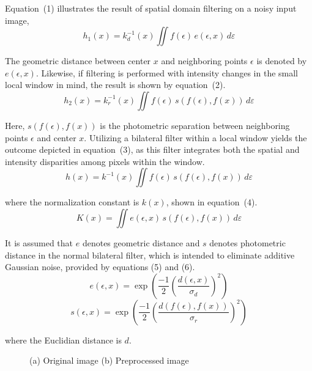 \documentclass[conference]{IEEEtran}
\begin{document}
Equation~(1) illustrates the result of spatial domain filtering on a noisy input image,
\begin{equation}
h_1(x) = k_d^{-1}(x) \iint f(\epsilon)\,e(\epsilon,x)\,d\varepsilon
\end{equation}

The geometric distance between center $x$ and neighboring points $\epsilon$ is denoted by $e(\epsilon,x)$. Likewise, if filtering is performed with intensity changes in the small local window in mind, the result is shown by equation~(2).
\begin{equation}
h_2(x) = k_r^{-1}(x) \iint f(\epsilon)\,s(f(\epsilon),f(x))\,d\varepsilon
\end{equation}

Here, $s(f(\epsilon),f(x))$ is the photometric separation between neighboring points $\epsilon$ and center $x$. Utilizing a bilateral filter within a local window yields the outcome depicted in equation~(3), as this filter integrates both the spatial and intensity disparities among pixels within the window.
\begin{equation}
h(x) = k^{-1}(x) \iint f(\epsilon)\,s(f(\epsilon),f(x))\,d\varepsilon
\end{equation}

where the normalization constant is $k(x)$, shown in equation~(4).
\begin{equation}
K(x) = \iint e(\epsilon,x)\,s(f(\epsilon),f(x))\,d\varepsilon
\end{equation}

It is assumed that $e$ denotes geometric distance and $s$ denotes photometric distance in the normal bilateral filter, which is intended to eliminate additive Gaussian noise, provided by equations (5) and (6).
\begin{equation}
e(\epsilon,x) = \exp\left(\frac{-1}{2}\left(\frac{d(\epsilon,x)}{\sigma_d}\right)^2\right)
\end{equation}
\begin{equation}
s(\epsilon,x) = \exp\left(\frac{-1}{2}\left(\frac{d(f(\epsilon),f(x))}{\sigma_r}\right)^2\right)
\end{equation}

where the Euclidian distance is $d$.

\begin{figure}[htbp]
\centering
{}
\caption{(a) Original image (b) Preprocessed image}
\label{fig2}
\end{figure}
\end{document}
